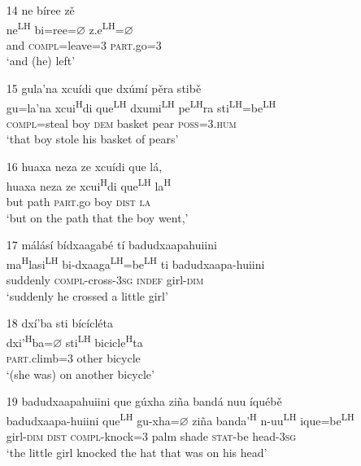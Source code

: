 \begin{itemize}
 
 \item[14]
\glll ne b\'{i}ree z\v{e}\\
ne\textsuperscript{LH} bi=ree={$\varnothing$} z.e\textsuperscript{LH}={$\varnothing$}\\
and \textsc{compl}=leave=\textsc{3} \textsc{part}.go=\textsc{3}\\
\glt `and (he) left'


\item[15]
\glll gula'na xcu\'{i}di que dx\'{u}m\'{i} p\v{e}ra stib\v{e}\\
gu=la'na xcui\textsuperscript{H}di que\textsuperscript{LH} dxumi\textsuperscript{LH} pe\textsuperscript{LH}ra sti\textsuperscript{LH}=be\textsuperscript{LH}\\
\textsc{compl}=steal boy \textsc{dem} basket pear \textsc{poss}=\textsc{3.hum}\\
\glt `that boy stole his basket of pears'


\item[16]
\glll huaxa neza ze xcu\'{i}di que l\'{a},\\
huaxa neza ze xcui\textsuperscript{H}di que\textsuperscript{LH} la\textsuperscript{H}\\
but path \textsc{part}.go boy \textsc{dist} \textsc{la}\\
\glt `but on the path that the boy went,'
\glend


\item[17]
\glll m\'{a}l\'{a}s\'{i} b\'{i}dxaagab\'{e} t\'{i} badudxaapahuiini\\
ma\textsuperscript{H}lasi\textsuperscript{LH} bi-dxaaga\textsuperscript{LH}=be\textsuperscript{LH} ti badudxaapa-huiini\\
suddenly \textsc{compl}-cross-3\textsc{sg} \textsc{indef} girl-\textsc{dim}\\
\glt `suddenly he crossed a little girl'
\glend


\item[18]
\glll dx\'{i}'ba sti b\'{i}c\'{i}cl\'{e}ta\\
dxi'\textsuperscript{H}ba=$\varnothing$ sti\textsuperscript{LH} bicicle\textsuperscript{H}ta\\
\textsc{part}.climb=\textsc{3} other bicycle\\
\glt `(she was) on another bicycle'


\item[19]
\glll badudxaapahuiini que g\'{u}xha zi\~{n}a band\'{a} nuu \'{i}qu\'{e}b\v{e}\\
badudxaapa-huiini que\textsuperscript{LH} gu-xha=$\varnothing$ zi\~{n}a banda'\textsuperscript{H} n-uu\textsuperscript{LH} ique=be\textsuperscript{LH}\\
girl-\textsc{dim} \textsc{dist} \textsc{compl}-knock=\textsc{3} palm shade \textsc{stat}-be head-3\textsc{sg}\\
\glt `the little girl knocked the hat that was on his head' 



\end{itemize}

